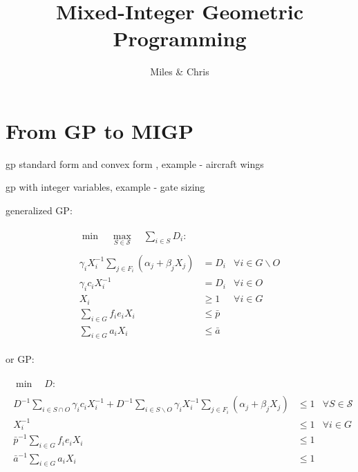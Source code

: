 \documentclass[]{article}
\title{Mixed-Integer Geometric Programming}
\author{Miles \& Chris}
\date{}
\begin{document}
\maketitle


\section{From GP to MIGP}

gp standard form and convex form \cite{boyd07}, example - aircraft wings \cite{hoburg14a}

gp with integer variables, example - gate sizing \cite{boyd07}

generalized GP:

\begin{subequations}
\begin{gather}
\begin{align}
\min \quad \max_{S \in \mathcal{S}} \quad
\sum_{i \in S} D_i :
\end{align}
\\
\begin{align}
\gamma_i X_i^{-1} \sum_{j \in F_i} \left( \alpha_j + \beta_j X_j \right) 
& = D_i
& \forall i \in G \backslash O
\\
\gamma_i c_i X_i^{-1} 
& = D_i 
& \forall i \in O
\\
X_i
& \geq 1
& \forall i \in G
\\
\sum_{i \in G} f_i e_i X_i 
& \leq \bar{p}
\\
\sum_{i \in G} a_i X_i 
& \leq \bar{a}
\end{align}
\end{gather}
\end{subequations}

or GP:

\begin{subequations}
\begin{gather}
\begin{align}
\min \quad D :
\end{align}
\\
\begin{align}
D^{-1} \sum_{i \in S \cap O} \gamma_i c_i X_i^{-1} + D^{-1} \sum_{i \in S \backslash O} \gamma_i X_i^{-1} \sum_{j \in F_i} \left( \alpha_j + \beta_j X_j \right)
& \leq 1
& \forall S \in \mathcal{S}
\\
X_i^{-1}
& \leq 1
& \forall i \in G
\\
\bar{p}^{-1} \sum_{i \in G} f_i e_i X_i 
& \leq 1
\\
\bar{a}^{-1} \sum_{i \in G} a_i X_i 
& \leq 1
\end{align}
\end{gather}
\end{subequations}
\end{document}
